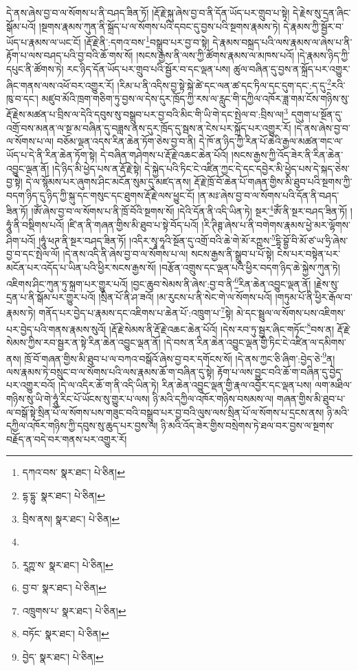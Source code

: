 དེ་ནས་ཞེས་བྱ་བ་ལ་སོགས་པ་ནི་བཤད་ཟིན་ཏོ། །རྡོ་རྗེ་སྐུ་ཞེས་བྱ་བ་ནི་དོན་ཡོད་པར་གྲུབ་པ་སྟེ། དེ་རྗེས་སུ་དྲན་ཞིང་སྒོམ་པའོ། །སྔགས་རྣམས་ཀུན་ནི་སྐྲོད་པ་ལ་སོགས་པའི་དབང་དུ་བྱས་པའི་སྔགས་རྣམས་ཏེ། དེ་རྣམས་ཀྱི་སྦྱོར་བ་ཡོད་པ་རྣམས་ལ་ཡང་ངོ། །རྡོ་རྗེ་ནི་:དགའ་བས་\footnote{དཀའ་བས་  སྣར་ཐང་།  པེ་ཅིན། }བསྒྲུབ་པར་བྱ་བ་སྟེ། དེ་རྣམས་བསྐྲད་པའི་ལས་རྣམས་ལ་ཞེས་པ་ནི་རྟོག་པ་ལས་བཤད་པའི་བྱ་བའི་ཆོ་གས་སོ། །སངས་རྒྱས་ནི་ལས་ཀྱི་ཚོགས་རྣམས་ལ་མཁས་པའོ། །དེ་རྣམས་ཉིད་ཀྱི་དཔུང་ནི་ཚོགས་ཏེ། རང་ཉིད་དོན་ཡོད་པར་གྲུབ་པའི་སྦྱོར་བ་དང་ལྡན་པས། ཚུལ་བཞིན་དུ་བྱས་ན་སྐྲོད་པར་འགྱུར་ཞིང་གནས་ལས་འཕོ་བར་འགྱུར་རོ། །རིམ་པ་ནི་འདིས་བྱ་སྟེ་སྐེ་ཚེ་དང་ལན་ཚ་དང་ཏིལ་དང་དུག་དང་:ད་དུ་\footnote{དྷ་དྷུ་  སྣར་ཐང་།  པེ་ཅིན། }རའི་ཁུ་བ་དང་། མཛུབ་མོའི་ཁྲག་གཅིག་ཏུ་བྱས་ལ་དེས་དུར་ཁྲོད་ཀྱི་རས་ལ་རླུང་གི་དཀྱིལ་འཁོར་ཟླ་གམ་ངོས་གཉིས་སུ་རྡོ་རྗེས་མཚན་པ་བྲིས་ལ་དེའི་དབུས་སུ་བསྒྲུབ་པར་བྱ་བའི་མིང་གི་ཡི་གེ་དང་སྤེལ་བ་:བྲིས་ལ།\footnote{བྲིས་ནས།  སྣར་ཐང་།  པེ་ཅིན། } དགུག་པ་སྔོན་དུ་འགྲོ་བས་མནན་ལ་སྔ་མ་བཞིན་དུ་བཟླས་ནས་དུར་ཁྲོད་དུ་སྦས་ན་ངེས་པར་སྐྲོད་པར་འགྱུར་རོ། །དེ་ནས་ཞེས་བྱ་བ་ལ་སོགས་པ་ལ། བཅོམ་ལྡན་འདས་རིན་ཆེན་ཏོག་ཅེས་བྱ་བ་ནི། དེ་ཁོ་ན་ཉིད་ཀྱི་རིན་པོ་ཆེའི་རྒྱལ་མཚན་གང་ལ་ཡོད་པ་དེ་ནི་རིན་ཆེན་ཏོག་སྟེ། དེ་བཞིན་གཤེགས་པ་རྡོ་རྗེ་འཆང་ཆེན་པོའོ། །སངས་རྒྱས་ཀྱི་འོད་ཟེར་ནི་རིན་ཆེན་འབྱུང་ལྡན་ནོ། །དེ་ཉིད་མི་ཕྱེད་པས་ན་རྡོ་རྗེ་སྟེ། དེ་སྐྱེད་པའི་ཏིང་ངེ་འཛིན་ཀྱང་དེ་དང་དབྱེར་མི་ཕྱེད་པས་དེ་སྐད་ཅེས་བྱ་སྟེ། དེ་ལ་སྙོམས་པར་ཞུགས་ཤིང་མངོན་སུམ་དུ་མཛད་ནས། རྡོ་རྗེ་ཁྲོ་བོ་ཆེན་པོ་གཞན་གྱིས་མི་ཐུབ་པའི་སྔགས་ཀྱི་བདག་ཉིད་དུ་ཉིད་ཀྱི་སྐུ་དང་གསུང་དང་ཐུགས་རྡོ་རྗེ་ལས་ཕྱུང་ངོ། །ན་མཿ་ཞེས་བྱ་བ་ལ་སོགས་པའི་དོན་ནི་བཤད་ཟིན་ཏོ། །ཨོཾ་ཞེས་བྱ་བ་ལ་སོགས་པ་ནི་ཁྲོ་བོའི་སྔགས་སོ། །དེའི་དོན་ནི་འདི་ཡིན་ཏེ། སྔར་\footnote{}ཨོཾ་ནི་སྔར་བཤད་ཟིན་ཏོ། །ཧཱུཾ་ནི་བསྡིགས་པའོ། །ཛི་ན་ནི་གཞན་གྱིས་མི་ཐུབ་པ་སྟེ་བོད་པའོ། །རི་ཊིཊྚ་ཞེས་པ་ནི་བགེགས་རྣམས་ཕྱེ་མར་ལྷོགས་ཤིག་པའོ། །ཧཱུཾ་ཕཊ་ནི་སྔར་བཤད་ཟིན་ཏོ། །འདིར་སྭཱ་ཧཱའི་སྔོན་དུ་འགྲོ་བའི་ཆེ་གེ་མོ་རཀྵས་\footnote{རཱཀྵ་ས་  སྣར་ཐང་།  པེ་ཅིན། }དྷི་བྷྱོ་བི་མོ་ཙ་ཡ་ཧྲི་ཞེས་བྱ་བ་དང་སྤེལ་ལོ། །དེ་ནས་འདི་ནི་ཞེས་བྱ་བ་ལ་སོགས་པ་ལ། སངས་རྒྱས་ནི་སྒྲུབ་པ་པོ་སྟེ། ངེས་པར་བསྟེན་པར་མངོན་པར་འདོད་པ་ཡིན་པའི་ཕྱིར་སངས་རྒྱས་སོ། །བརྩོན་འགྲུས་དང་ལྡན་པའི་ཕྱིར་བདག་ཉིད་ཆེ་སྐྱེས་ཀུན་ཏེ། འཇིགས་ཤིང་ཀུན་ཏུ་སྐྲག་པར་གྱུར་པའོ། །བྱང་ཆུབ་སེམས་ནི་ཞེས་:བྱ་བ་ནི་\footnote{བྱ་བ་  སྣར་ཐང་།  པེ་ཅིན། }རིན་ཆེན་འབྱུང་ལྡན་ནོ། །རྗེས་སུ་དྲན་པ་ནི་སྒོམ་པར་གྱུར་པའོ། །སྲིན་པོ་ནི་ཤ་ཟའོ། །མ་རུངས་པ་ནི་སེང་གེ་ལ་སོགས་པའོ། །གཏུམ་པོ་ནི་ཕྱིར་རྒོལ་བ་རྣམས་ཏེ། གནོད་པར་བྱེད་པ་རྣམས་དང་འཇིགས་པ་ཆེན་པོ་:འཁྲུག་པ་\footnote{འཁྲུགས་པ་  སྣར་ཐང་།  པེ་ཅིན། }སྟེ། མེ་དང་སྦྲུལ་ལ་སོགས་པས་འཇིགས་པར་བྱེད་པའི་གནས་རྣམས་སུའོ། །རྡོ་རྗེ་སེམས་ནི་རྡོ་རྗེ་འཆང་ཆེན་པོའོ། །དེས་རབ་ཏུ་སྦྱར་ཞིང་གཏོང་\footnote{བཏོང་  སྣར་ཐང་།  པེ་ཅིན། }བས་ན། རྡོ་རྗེ་སེམས་ཀྱིས་རབ་སྦྱར་ན་སྟེ་རིན་ཆེན་འབྱུང་ལྡན་ནོ། །དེ་བས་ན་རིན་ཆེན་འབྱུང་ལྡན་གྱི་ཏིང་ངེ་འཛིན་ལ་དམིགས་ནས། ཁྲོ་བོ་གཞན་གྱིས་མི་ཐུབ་པ་ལ་བཀའ་བསྒོའོ་ཞེས་བྱ་བར་དགོངས་སོ། །དེ་ནས་ཀྱང་ཅི་ཞིག་:བྱེད་ཅེ་\footnote{བྱེད་  སྣར་ཐང་།  པེ་ཅིན། }ན། ལས་རྣམས་ཏེ་བསྲུང་བ་ལ་སོགས་པའི་ལས་རྣམས་ཆོ་ག་བཞིན་དུ་སྟེ། རྟོག་པ་ལས་བྱུང་བའི་ཆོ་ག་བཞིན་དུ་བྱེད་པར་འགྱུར་བའོ། །དེ་ལ་འདིར་ཆོ་ག་ནི་འདི་ཡིན་ཏེ། རིན་ཆེན་འབྱུང་ལྡན་གྱི་རྣལ་འབྱོར་དང་ལྡན་པས། ལག་མཐིལ་གཉིས་སུ་ཡི་གེ་ཧཱུཾ་རིང་པོ་ཡོངས་སུ་གྱུར་པ་ལས། ཉི་མའི་དཀྱིལ་འཁོར་གཉིས་བསམས་ལ། གཞན་གྱིས་མི་ཐུབ་པ་ལ་བསྒོ་སྟེ་སྲིན་པོ་ལ་སོགས་པས་གཟུང་བའི་བསྒྲུབ་པར་བྱ་བའི་ལུས་ལས་སྲིན་པོ་ལ་སོགས་པ་དྲངས་ནས། ཉི་མའི་དཀྱིལ་འཁོར་གཉིས་ཀྱི་དབུས་སུ་ཆུད་པར་བྱས་ལ། ཉི་མའི་འོད་ཟེར་གྱིས་བསྲེགས་ཏེ་ཐལ་བར་བྱས་ལ་སྔགས་བརྗོད་ན་བདེ་བར་གནས་པར་འགྱུར་རོ། 